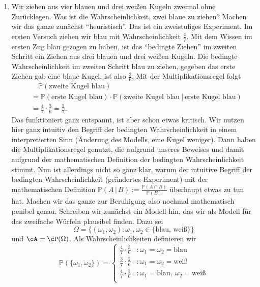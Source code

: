 \begin{beispiel}\abs
	\begin{enumerate}[label=(\roman*)]
		\item Wir ziehen aus vier blauen und drei weißen Kugeln zweimal ohne Zurücklegen. Was ist die Wahrscheinlichkeit, zwei blaue zu ziehen? Machen wir das ganze zun\"achst \enquote{heuristisch}. Das ist ein zweistufiges Experiment. Im ersten Versuch ziehen wir blau mit Wahrscheinlichkeit $\frac{4}{7}$. Mit dem Wissen im ersten Zug blau gezogen zu haben, ist das \enquote{bedingte Ziehen} im zweiten Schritt ein Ziehen aus drei blauen und drei wei\ss en Kugeln. Die bedingte Wahrscheinlichkeit im zweiten Schritt blau zu ziehen, gegeben das erste Ziehen gab eine blaue Kugel, ist also $\frac{3}{6}$. Mit der Multiplikationsregel folgt
		\begin{align*} 
		&\quad \mathbb{P}(\text{zweite Kugel blau}) \\
		&= \mathbb{P}(\text{erste Kugel blau}) \cdot \mathbb{P}(\text{zweite Kugel blau} \: | \: \text{erste Kugel blau})\\
		& = \frac{4}{7}\cdot \frac{3}{6} = \frac{2}{7}.
		\end{align*}
		Das funktioniert ganz entspannt, ist aber schon etwas kritisch. Wir nutzen hier ganz intuitiv den Begriff der bedingten Wahrscheinlichkeit in einem interpretierten Sinn (\"Anderung des Modells, eine Kugel weniger). Dann haben die Multiplikationsregel genutzt, die aufgrund unseres Beweises und damit aufgrund der mathematischen Definition der bedingten Wahrscheinlichkeit stimmt. Nun ist allerdings nicht so ganz klar, warum der intuitive Begriff der bedingten Wahrscheinlichkeit (ge\"andertes Experiment) mit der mathematischen Definition $\mathbb P(A\,|\,B):=\frac{\mathbb P(A\cap B)}{\mathbb P(B)}$ \"uberhaupt etwas zu tun hat. Machen wir das ganze zur Beruhigung also nochmal mathematisch penibel genau. Schreiben wir zun\"achst ein Modell hin, das wir als Modell f\"ur das zweifache W\"urfeln plausibel finden. Dazu sei
		$$\Omega = \{ (\omega_1,\omega_2)\colon \omega_1, \omega_2 \in \{ \text{blau, weiß} \} \}$$
		und $\cA = \cP(\Omega)$. Als Wahrscheinlichkeiten definieren wir
		\[ \mathbb{P}(\{ \omega_1, \omega_2 \}) = \begin{cases}
		\frac{4}{7} \cdot \frac{3}{6}&: \omega_1 = \omega_2 = \text{blau}\\
		\frac{3}{7} \cdot \frac{2}{6}&: \omega_1 = \omega_2 = \text{weiß}\\
		\frac{4}{7} \cdot \frac{3}{6}&: \omega_1 = \text{blau}, \: \omega_2 = \text{weiß}\\		

\end{cases}\]
\end{enumerate}
\end{beispiel}
